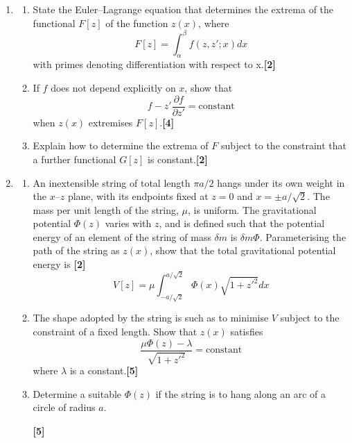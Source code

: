 \documentclass[a4paper]{article}
\begin{document}
\begin{qns}\leavevmode
\begin{enumerate}[label=(\alph*)]
\item
\begin{enumerate}[label=(\roman*)]
\item State the Euler–Lagrange equation that determines the extrema of the functional $F[z]$ of the function $z(x)$, where
$$F[z]=\int_\alpha^\beta f(z,z';x)dx$$
with primes denoting differentiation with respect to x.\hfill \textbf{[2]}
\item If $f$ does not depend explicitly on $x$, show that
$$f-z'\frac{\partial f}{\partial z'}=\text{constant}$$
when $z(x)$ extremises $F[z]$.\hfill \textbf{[4]}
\item Explain how to determine the extrema of $F$ subject to the constraint that a further functional $G[z]$ is constant.\hfill \textbf{[2]}
\end{enumerate}
\item
\begin{enumerate}[label=(\roman*)]
\item  An inextensible string of total length $\pi a/2$ hangs under its own weight in the $x$–$z$ plane, with its endpoints fixed at $z = 0$ and $x = \pm a/\sqrt{2}$. The mass per unit length of the string, $\mu$, is uniform. The gravitational potential $\Phi(z)$ varies with $z$, and is defined such that the potential energy of an element of the string of mass $\delta m$ is $\delta m\Phi$. Parameterising the path of the string as $z(x)$, show that the total gravitational potential energy is \hfill \textbf{[2]}
$$V[z]=\mu\int_{-a/\sqrt{2}}^{a/\sqrt{2}}\Phi(x)\sqrt{1+z'^2}dx$$
\item The shape adopted by the string is such as to minimise $V$ subject to the constraint of a fixed length. Show that $z(x)$ satisfies
$$\frac{\mu\Phi(z)-\lambda}{\sqrt{1+z'^2}}=\text{constant}$$
where $\lambda$ is a constant.\hfill \textbf{[5]}
\item Determine a suitable $\Phi(z)$ if the string is to hang along an arc of a circle of radius $a$. 

\hfill \textbf{[5]}
\end{enumerate}
\end{enumerate}
\end{qns}
\end{document}
